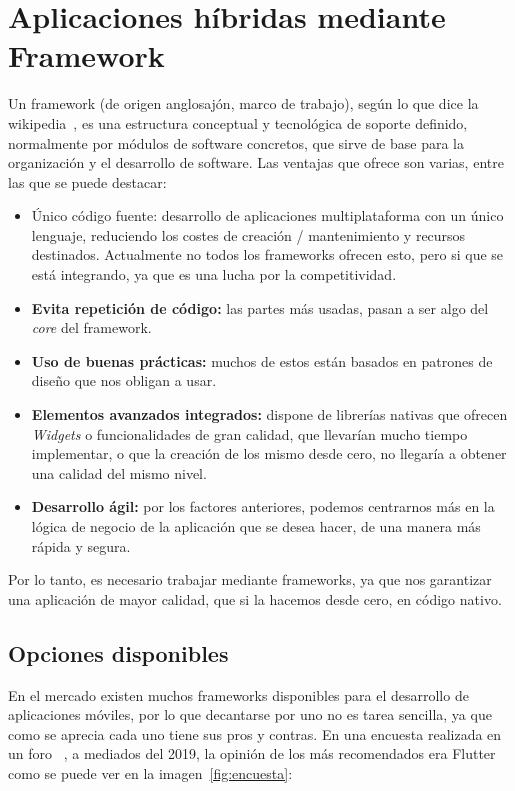 \section{Aplicaciones híbridas mediante Framework}
Un framework (de origen anglosajón, marco de trabajo), según lo que dice la wikipedia~\cite{wiki:framework}, es una estructura conceptual y tecnológica de soporte definido, normalmente por módulos de software concretos, que sirve de base para la organización y el desarrollo de software. Las ventajas que ofrece son varias, entre las que se puede destacar:

\begin{itemize}
	\item{Único código fuente}: desarrollo de aplicaciones multiplataforma con un único lenguaje, reduciendo los costes de creación / mantenimiento y recursos destinados. Actualmente no todos los frameworks ofrecen esto, pero si que se está integrando, ya que es una lucha por la competitividad.
	\item \textbf{Evita repetición de código:} las partes más usadas, pasan a ser algo del \emph{core} del framework.
	\item \textbf{Uso de buenas prácticas:} muchos de estos están basados en patrones de diseño que nos obligan a usar.
	\item \textbf{Elementos avanzados integrados:} dispone de librerías nativas que ofrecen \emph{Widgets} o funcionalidades de gran calidad, que llevarían mucho tiempo implementar, o que la creación de los mismo desde cero, no llegaría a obtener una calidad del mismo nivel.
	\item \textbf{Desarrollo ágil:} por los factores anteriores, podemos centrarnos más en la lógica de negocio de la aplicación que se desea hacer, de una manera más rápida y segura.
\end{itemize}

Por lo tanto, es necesario trabajar mediante frameworks, ya que nos garantizar una aplicación de mayor calidad, que si la hacemos desde cero, en código nativo.

\subsection{Opciones disponibles}
En el mercado existen muchos frameworks disponibles para el desarrollo de aplicaciones móviles, por lo que decantarse por uno no es tarea sencilla, ya que como se aprecia cada uno tiene sus pros y contras. En una encuesta realizada en un foro ~\cite{foro:encuesta}, a mediados del 2019, la opinión de los más recomendados era Flutter como se puede ver en la imagen~\ref{fig:encuesta}:

